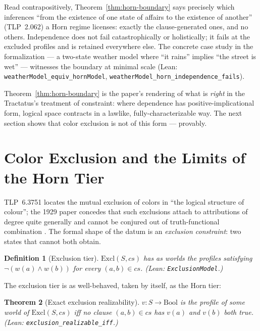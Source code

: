 \documentclass[10pt, letterpaper]{article}
\newtheorem{theorem}{Theorem}[section]
\newtheorem{definition}[theorem]{Definition}
\theoremstyle{remark}
\newcommand{\lean}[1]{\texttt{#1}}
\newcommand{\TLP}[1]{TLP~#1}
\begin{document}
Read contrapositively, Theorem~\ref{thm:horn-boundary} says precisely which inferences ``from the
existence of one state of affairs to the existence of another''
(\TLP{2.062}) a Horn regime licenses: exactly the clause-generated ones, and
no others. Independence does not fail catastrophically or holistically; it
fails at the excluded profiles and is retained everywhere else. The
concrete case study in the formalization --- a two-state weather model where
``it rains'' implies ``the street is wet'' --- witnesses the boundary at
minimal scale (Lean: \lean{weatherModel\_equiv\_hornModel},
\lean{weatherModel\_horn\_independence\_fails}).

Theorem~\ref{thm:horn-boundary} is the paper's rendering of what is
\emph{right} in the Tractatus's treatment of constraint: where dependence has
positive-implicational form, logical space contracts in a lawlike,
fully-characterizable way. The next section shows that color exclusion is
not of this form --- provably.

\section{Color Exclusion and the Limits of the Horn Tier}
\label{sec:exclusion}

\TLP{6.3751} locates the mutual exclusion of colors in ``the logical
structure of colour''; the 1929 paper concedes that such exclusions attach to
attributions of degree quite generally and cannot be conjured out of
truth-functional combination \cite{wittgenstein1929}. The formal shape of the
datum is an \emph{exclusion constraint}: two states that cannot both obtain.

\begin{definition}[Exclusion tier]\label{def:exclusion}
$\mathrm{Excl}(S, \mathit{cs})$ has as worlds the profiles satisfying
$\neg(w(a) \wedge w(b))$ for every $(a, b) \in \mathit{cs}$. (Lean:
\lean{ExclusionModel}.)
\end{definition}

The exclusion tier is as well-behaved, taken by itself, as the Horn tier:

\begin{theorem}[Exact exclusion realizability]\label{thm:excl-boundary}
$v : S \to \mathrm{Bool}$ is the profile of some world of
$\mathrm{Excl}(S, \mathit{cs})$ iff no clause $(a, b) \in \mathit{cs}$ has
$v(a)$ and $v(b)$ both true. (Lean: \lean{exclusion\_realizable\_iff}.)
\end{theorem}
\end{document}
